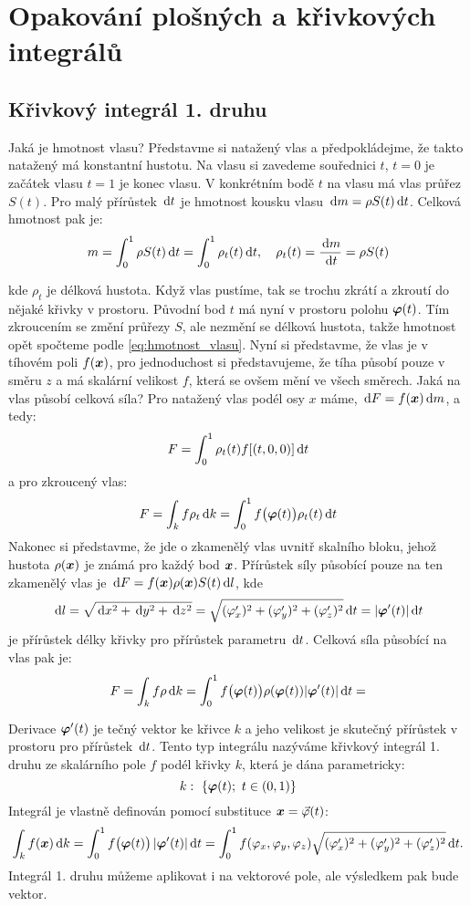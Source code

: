 \section{Opakování plošných a křivkových integrálů}

\subsection{Křivkový integrál 1. druhu}
Jaká je hmotnost vlasu? Představme si natažený vlas a předpokládejme, že takto natažený má konstantní hustotu. 
Na vlasu si zavedeme souřednici $t$, $t=0$ je začátek vlasu $t=1$ je konec vlasu.
V konkrétním bodě $t$ na vlasu má vlas průřez $S(t)$. Pro malý přírůstek $\,{\rm d} t$ je hmotnost kousku vlasu $\,{\rm d} m = \rho S(t)\,{\rm d} t$.
Celková hmotnost pak je:
\begin{equation}
    \label{eq:hmotnost_vlasu}    
    m=\int_0^1 \rho S(t) \,{\rm d} t = \int_0^1 \rho_t(t) \,{\rm d} t,\quad \rho_t(t) = \frac{\,{\rm d} m}{\,{\rm d} t}= \rho S(t)
\end{equation}


kde $\rho_t$ je délková hustota. Když vlas pustíme, tak se trochu zkrátí a zkroutí do nějaké křivky v prostoru. Původní bod $t$ má nyní v prostoru polohu 
$\mathbf{\boldsymbol{\varphi}}(t)$. Tím zkroucením se změní průřezy $S$, ale nezmění se délková hustota, takže hmotnost opět spočteme podle \ref{eq:hmotnost_vlasu}.
Nyní si představme, že vlas je v tíhovém poli $f(\mathbf{\boldsymbol{x}})$, pro jednoduchost si představujeme, že tíha působí pouze v směru $z$ a má skalární velikost $f$,
která se ovšem mění ve všech směrech. Jaká na vlas působí celková síla? Pro natažený vlas podél osy $x$ máme, $\,{\rm d} F = f(\mathbf{\boldsymbol{x}}) \,{\rm d} m$, a tedy:
\[
  F = \int_0^1 \rho_t(t) f[(t,0,0)] \,{\rm d} t
\]
a pro zkroucený vlas:
\[
   F=\int_k f \rho_t \,{\rm d} k = \int_0^1 f\big(\mathbf{\boldsymbol{\varphi}}(t)\big)\rho_t(t) \,{\rm d}{t}
\]
Nakonec si představme, že jde o zkamenělý vlas uvnitř skalního bloku, jehož hustota $\rho(\mathbf{\boldsymbol{x}})$ je známá pro každý bod $\mathbf{\boldsymbol{x}}$. Přírůstek síly působící
pouze na ten zkamenělý vlas je $\,{\rm d} F = f(\mathbf{\boldsymbol{x}}) \rho(\mathbf{\boldsymbol{x}}) S(t) \,{\rm d} l$, kde 
\[
    \,{\rm d} l = \sqrt{ \,{\rm d} x^2 + \,{\rm d} y^2 + \,{\rm d} z^2 } = \sqrt{ (\varphi_x')^2+(\varphi_y')^2+(\varphi_z')^2} \,{\rm d}{t} = \lvert\mathbf{\boldsymbol{\varphi}}'(t)\rvert \,{\rm d}{t}
\]
 je přírůstek délky křivky pro přírůstek parametru $\,{\rm d} t$. Celková síla působící na vlas pak je:
\[
   F=\int_k f \rho \,{\rm d} k = \int_0^1 f\big(\mathbf{\boldsymbol{\varphi}}(t)\big)\rho( \mathbf{\boldsymbol{\varphi}}(t)) \lvert\mathbf{\boldsymbol{\varphi}}'(t)\rvert \,{\rm d}{t}=
\]

Derivace $\mathbf{\boldsymbol{\varphi}}'(t)$ je tečný vektor ke křivce $k$ a jeho velikost je skutečný přírůstek v prostoru pro přírůstek $\,{\rm d} t$.
Tento typ integrálu nazýváme křivkový integrál 1. druhu ze skalárního pole $f$ podél křivky $k$, která je dána parametricky:
\[
   k:\ \{ \mathbf{\boldsymbol{\varphi}}(t);\ t\in (0,1)\}
\]
Integrál je vlastně definován pomocí substituce $\mathbf{\boldsymbol{x}} = \vec {\varphi}(t)$:
\begin{equation}
   \label{eq:curve_1_int}
   \int_k f(\mathbf{\boldsymbol{x}}) \,{\rm d} k = \int_0^1 f\big(\mathbf{\boldsymbol{\varphi}}(t)\big)\, \lvert\mathbf{\boldsymbol{\varphi}}'(t)\rvert \,{\rm d}{t}=
   \int_0^1 f(\varphi_x,\varphi_y,\varphi_z) \sqrt{ (\varphi_x')^2+(\varphi_y')^2+(\varphi_z')^2} \,{\rm d}{t}.
\end{equation}
Integrál 1. druhu můžeme aplikovat i na vektorové pole, ale výsledkem pak bude vektor. 

